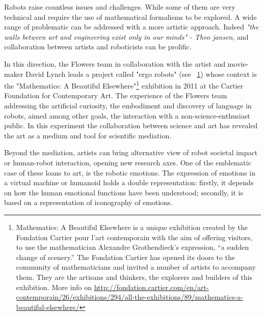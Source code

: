 Robots raise countless issues and challenges. While some of them are very technical and require the use of mathematical formalisms to be explored. A wide range of problematic can be addressed with a more artistic approach.
Indeed \emph{"the walls between art and engineering exist only in our minds" - Theo jansen}, and collaboration between artists and roboticists can be prolific.


\begin{figure}[!t]
\centering
    \hfil
    \caption{}
    \label{fig:ergo_robot}
\end{figure}

In this direction, the Flowers team in collaboration with the artist and movie-maker David Lynch leads a project called "ergo robots" (see \figurename~\ref{fig:ergo_robot}) whose context is the "Mathematics: A Beautiful Elsewhere"\footnote{Mathematics: A Beautiful Elsewhere is a unique exhibition created by the Fondation Cartier pour l’art contemporain with the aim of offering visitors, to use the mathematician Alexandre Grothendieck’s expression, “a sudden change of scenery.” The Fondation Cartier has opened its doors to the community of mathematicians and invited a number of artists to accompany them. They are the artisans and thinkers, the explorers and builders of this exhibition. More info on \url{http://fondation.cartier.com/en/art-contemporain/26/exhibitions/294/all-the-exhibitions/89/mathematics-a-beautiful-elsewhere/}} exhibition in 2011 at the Cartier Foundation for Contemporary Art. The experience of the Flowers team addressing the artificial curiosity, the embodiment and discovery of language in robots, aimed among other goals, the interaction with a non-science-enthusiast public. In this experiment the collaboration between science and art has revealed the art as a medium and tool for scientific mediation.


Beyond the mediation, artists can bring alternative view of robot societal impact or human-robot interaction, opening new research axes.
One of the emblematic case of these loans to art, is the robotic emotions. The expression of emotions in a virtual machine or humanoid holds a double representation: firstly, it depends on how the human emotional functions have been understood; secondly, it is based on a representation of iconography of emotions.

